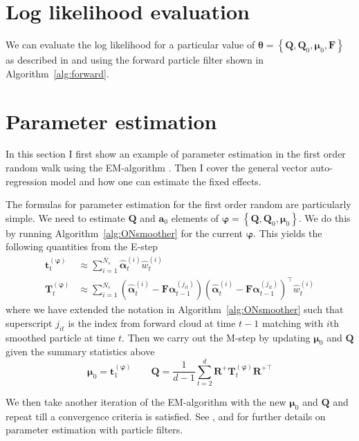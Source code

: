 \documentclass[notitlepage]{article}
\renewcommand{\vec}[1]{\bm{#1}}
\newcommand{\mat}[1]{\mathbf{#1}}
\newcommand{\Lbrace}[1]{\left\{ #1\right\}}
\newcommand{\Lparen}[1]{\left( #1\right)}
\newcommand{\partic}[3]{#1_{#2}^{\Lparen{#3}}}
\newcommand{\particS}[3]{\widehat{#1}_{#2}^{\Lparen{#3}}}
\newcommand{\nPart}{N}
\newcommand{\nPeriods}{d}
\begin{document}
\section{Log likelihood evaluation}
We can evaluate the log likelihood for a particular value of $\vec{\theta} = \Lbrace{\mat{Q}, \mat{Q}_0, \vec \mu_0, \mat{F}}$ as described in \citet[p. 5]{doucet09} and \citet[p. 193]{malik11} using the forward particle filter shown in Algorithm~\ref{alg:forward}.

\section{Parameter estimation}
In this section I first show an example of parameter estimation in the first 
order random walk using the EM-algorithm \citep{dempster77}. Then I cover the 
general vector auto-regression model and how one can estimate the fixed 
effects.

The formulas for parameter estimation for the first order random are particularly simple. We need to estimate $\mat{Q}$ and $\vec{a}_0$ elements of $\vec{\varphi} = \Lbrace{\mat{Q}, \mat{Q}_0, \vec\mu_0}$. We do this by running Algorithm~\ref{alg:ONsmoother} for the current $\vec{\varphi}$. This yields the following quantities from the E-step%
%
\begin{equation}\begin{split}
\vec{t}_t^{(\vec{\varphi})} &\approx \sum_{i = 1}^{\nPart_s} \particS{\vec{\alpha}}{t}{i} \particS{w}{t}{i} \\
%
\vec{T}_t^{(\vec{\varphi})} & \approx \sum_{i = 1}^{\nPart_s}
	\Lparen{\particS{\vec{\alpha}}{t}{i} - \mat{F}\partic{\vec{\alpha}}{t-1}{j_{it}}}
	\Lparen{\particS{\vec{\alpha}}{t}{i} - \mat{F}\partic{\vec{\alpha}}{t-1}{j_{it}}}^\top
	\particS{w}{t}{i}
\end{split}\end{equation}%
%
%
where  we have extended the notation in Algorithm~\ref{alg:ONsmoother} such that superscript $j_{it}$ is the index from forward cloud at time $t-1$ matching with $i$th smoothed particle at time $t$.
Then we carry out the M-step by updating $\vec\mu_0$ and $\mat{Q}$ given the summary statistics above%
%
\begin{equation}
\vec\mu_0 = \vec{t}_1^{(\vec{\varphi})} \qquad
%
\mat{Q} = \frac{1}{\nPeriods - 1}\sum_{t = 2}^\nPeriods \mat{R}^+\vec{T}_t^{(\vec{\varphi})}\mat{R}^{+\top}
\end{equation}%

We then take another iteration of the EM-algorithm with the new $\vec\mu_0$ and $\mat{Q}$ 
and repeat
till a convergence criteria is satisfied.  See \cite{kantas15}, \cite{del10} and \cite{schon11} for further details on parameter estimation with particle filters.
\end{document}
